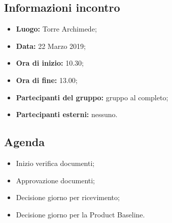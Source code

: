 \subsection{Informazioni incontro}
\begin{itemize}
	\item { \textbf{Luogo:} Torre Archimede};
	\item { \textbf{Data:} 22 Marzo 2019};
	\item { \textbf{Ora di inizio:} 10.30};
	\item { \textbf{Ora di fine:} 13.00};
	\item { \textbf{Partecipanti del gruppo:} gruppo al completo};
	\item { \textbf{Partecipanti esterni:} nessuno}.
\end{itemize}


\subsection{Agenda}
\begin{itemize}
	\item {Inizio verifica documenti;}
	\item {Approvazione documenti;}
	\item {Decisione giorno per ricevimento;}
	\item {Decisione giorno per la Product Baseline.}
\end{itemize}

